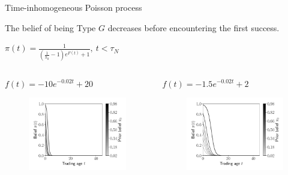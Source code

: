 \documentclass{beamer}
\begin{document}
\begin{frame}[allowframebreaks]{Time-inhomogeneous Poisson process}
\framebreak

The belief of being Type $G$ decreases before encountering the first success.

$\pi(t) = \frac{1}{(\frac{1}{\pi_0}-1) e^{F(t)}+1},\ t<\tau_N$

\begin{columns}[t]
	\begin{column}{0.49\textwidth}
		\begin{block}{$f(t)=-10e^{-0.02t}+20$}
			\begin{figure}
				\includegraphics[width=\linewidth]{figures/pis2}
			\end{figure}
		\end{block}  
	\end{column}
	
	\begin{column}{0.49\textwidth}
		\begin{block}{$f(t)=-1.5e^{-0.02t}+2$}
			\begin{figure}
				\includegraphics[width=\linewidth]{figures/pis1}
			\end{figure}
		\end{block}  
	\end{column}
\end{columns}

\end{frame}
\end{document}
